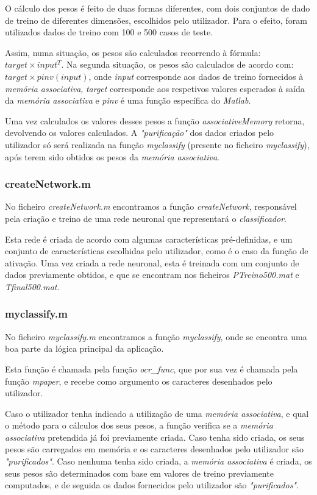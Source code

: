 \documentclass{article}
\begin{document}
O cálculo dos pesos é feito de duas formas diferentes, com dois conjuntos de dado de treino de diferentes dimensões, escolhidos pelo utilizador. Para o efeito, foram utilizados dados de treino com 100 e 500 casos de teste.

Assim, numa situação, os pesos são calculados recorrendo à fórmula: $target\times input^T$. Na segunda situação, os pesos são calculados de acordo com: $target\times pinv(input)$, onde \emph{input} corresponde aos dados de treino fornecidos à \emph{memória associativa}, \emph{target} corresponde aos respetivos valores esperados à saída da \emph{memória associativa} e \emph{pinv} é uma função específica do \emph{Matlab}.

Uma vez calculados os valores desses pesos a função \emph{associativeMemory} retorna, devolvendo os valores calculados. A \emph{"purificação"} dos dados criados pelo utilizador só será realizada na função \emph{myclassify} (presente no ficheiro \emph{myclassify}), após terem sido obtidos os pesos da \emph{memória associativa}.

\subsubsection{createNetwork.m}

No ficheiro \emph{createNetwork.m} encontramos a função \emph{createNetwork}, responsável pela criação e treino de uma rede neuronal que representará o \emph{classificador}.

Esta rede é criada de acordo com algumas características pré-definidas, e um conjunto de características escolhidas pelo utilizador, como é o caso da função de ativação. Uma vez criada a rede neuronal, esta é treinada com um conjunto de dados previamente obtidos, e que se encontram nos ficheiros \emph{PTreino500.mat} e \emph{Tfinal500.mat}.


\subsubsection{myclassify.m}

No ficheiro \emph{myclassify.m} encontramos a função \emph{myclassify}, onde se encontra uma boa parte da lógica principal da aplicação.

Esta função é chamada pela função \emph{ocr\_func}, que por sua vez é chamada pela função \emph{mpaper}, e recebe como argumento os caracteres desenhados pelo utilizador.

Caso o utilizador tenha indicado a utilização de uma \emph{memória associativa}, e qual o método para o cálculos dos seus pesos, a função verifica se a \emph{memória associativa} pretendida já foi previamente criada. Caso tenha sido criada, os seus pesos são carregados em memória e os caracteres desenhados pelo utilizador são \emph{"purificados"}. Caso nenhuma tenha sido criada, a \emph{memória associativa} é criada, os seus pesos são determinados com base em valores de treino previamente computados, e de seguida os dados fornecidos pelo utilizador são \emph{"purificados"}.
\end{document}

